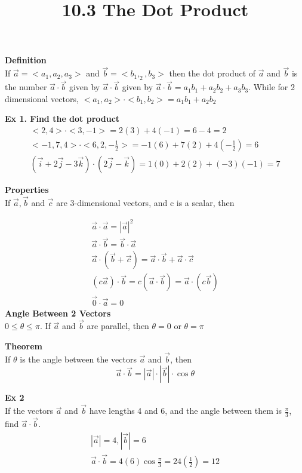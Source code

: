 \documentclass{article}
\title{10.3 The Dot Product}
\begin{document}
  \maketitle
  \textbf{Definition}\\
  If $  \vec{a} = <a_1, a_2, a_3> $ and $ \vec{b} = <b_1, _2, b_3> $ then the dot product of $ \vec{a} $ and $ \vec{b} $ is the number $ \vec{a} \cdot \vec{b} $ given by $ \vec{a} \cdot \vec{b} $ given by $ \vec{a} \cdot \vec{b} = a_1b_1+a_2b_2+a_3b_3 $. While for 2 dimensional vectors, $ <a_1, a_2> \cdot <b_1, b_2>= a_1b_1+a_2b_2 $

  \textbf{Ex 1. Find the dot product}
  \[
    \begin{gathered}
       <2, 4>\cdot <3, -1> = 2(3)+4(-1)=6-4=\boxed{2}\\
       < -1, 7, 4> \cdot <6, 2, -\frac{1}{2}> = -1(6) + 7(2) + 4( -\frac{1}{2}) = \boxed{6}\\
       ( \vec{i} + 2 \vec{j} - 3 \vec{k}) \cdot (2 \vec{j} - \vec{k})=1(0)+2(2)+(-3)(-1)=\boxed{7}
    \end{gathered}
  \]

  \textbf{Properties}\\
  If $ \vec{a}, \vec{b} $ and $ \vec{c} $ are 3-dimensional vectors, and c is a scalar, then

  \[
    \begin{gathered}
     \vec{a} \cdot \vec{a} = | \vec{a} |^2\\
     \vec{a} \cdot \vec{b} = \vec{b} \cdot \vec{a}\\
     \vec{a} \cdot ( \vec{b} + \vec{c}) = \vec{a} \cdot \vec{b} + \vec{a} \cdot \vec{c}\\
     (c \vec{a}) \cdot \vec{b} = c( \vec{a} \cdot \vec{b}) = \vec{a} \cdot (c \vec{b})\\
     \vec{0} \cdot \vec{a} = 0
    \end{gathered}
  \]
  \textbf{Angle Between 2 Vectors}\\
  $ 0 \le \theta \le \pi $. If $\vec{a}$ and $\vec{b}$ are parallel, then $ \theta = 0 $ or $ \theta = \pi $

  \textbf{Theorem}\\
  If $ \theta $ is the angle between the vectors $ \vec{a} $ and $ \vec{b} $, then
  \[
      \vec{a} \cdot \vec{b}=| \vec{a} |\cdot | \vec{b} | \cdot \cos{\theta}
  \]

  \textbf{Ex 2}\\
  If the vectors $ \vec{a} $ and $ \vec{b} $ have lengths 4 and 6, and the angle between them is $ \frac{\pi}{3} $, find $ \vec{a} \cdot \vec{b} $.
  \[
    \begin{aligned}
      | \vec{a} | = 4, | \vec{b} | = 6\\
      \vec{a} \cdot \vec{b} = 4(6) \cos{ \frac{\pi}{3}} = 24( \frac{1}{2}) = \boxed{12}
    \end{aligned}
  \]
\end{document}
